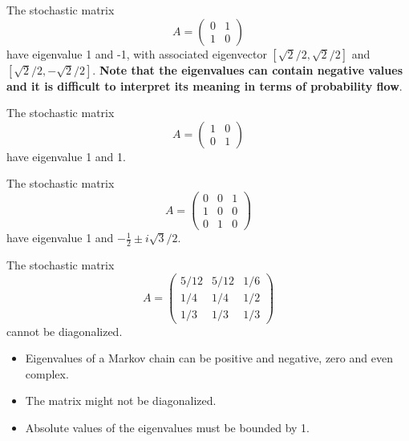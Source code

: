 \begin{refsection}
\begin{example}
	The stochastic matrix $$A = \begin{pmatrix}
	0 & 1\\
	1 & 0
	\end{pmatrix}$$
	have eigenvalue 1 and -1, with associated eigenvector $[\sqrt{2}/2, \sqrt{2}/2]$ and $[\sqrt{2}/2, -\sqrt{2}/2]$. \textbf{Note that the eigenvalues can contain negative values and it is difficult to interpret its meaning in terms of probability flow}.
\end{example}

\begin{example}
	The stochastic matrix $$A = \begin{pmatrix}
	1 & 0\\
	0 & 1
	\end{pmatrix}$$
	have eigenvalue 1 and 1.
\end{example}

\begin{example}
	The stochastic matrix $$A = \begin{pmatrix}
	0 & 0 & 1\\
	1 & 0 & 0\\
	0 & 1 & 0
	\end{pmatrix}$$
	have eigenvalue 1 and $-\frac{1}{2}\pm i \sqrt{3}/2$.
\end{example}

\begin{example}
	The stochastic matrix $$A = \begin{pmatrix}
	5/12 & 5/12 & 1/6\\
	1/4 & 1/4 & 1/2\\
	1/3 & 1/3 & 1/3
	\end{pmatrix}$$
	cannot be diagonalized.
\end{example}

\begin{remark}\hfill
	\begin{itemize}
		\item Eigenvalues of a Markov chain can be positive and negative, zero and even complex.
		\item The matrix might not be diagonalized.
		\item 	Absolute values of the eigenvalues must be bounded by 1. 
	\end{itemize}
\end{remark}


\end{refsection}
